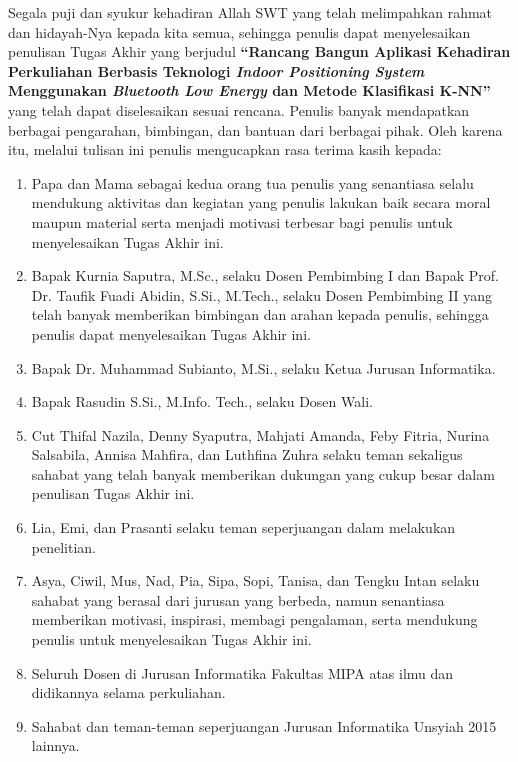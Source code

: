 \preface %


Segala puji dan syukur kehadiran Allah SWT yang telah melimpahkan rahmat dan hidayah-Nya kepada kita semua, sehingga penulis dapat menyelesaikan penulisan Tugas Akhir yang berjudul \textbf{“Rancang Bangun Aplikasi Kehadiran Perkuliahan Berbasis Teknologi \textit{Indoor Positioning System} Menggunakan \textit{Bluetooth Low Energy} dan Metode Klasifikasi K-NN”} yang telah dapat diselesaikan sesuai rencana. Penulis banyak mendapatkan berbagai pengarahan, bimbingan, dan bantuan dari berbagai pihak. Oleh karena itu, melalui tulisan ini penulis mengucapkan rasa terima kasih kepada:

\begin{enumerate}
	\item{Papa dan Mama sebagai kedua orang tua penulis yang senantiasa selalu mendukung aktivitas dan kegiatan yang penulis lakukan baik secara moral maupun material serta menjadi motivasi terbesar bagi penulis untuk menyelesaikan Tugas Akhir ini.}
		\item{Bapak Kurnia Saputra, M.Sc., selaku Dosen Pembimbing I dan Bapak Prof. Dr. Taufik Fuadi Abidin, S.Si., M.Tech., selaku Dosen Pembimbing II yang telah banyak memberikan bimbingan dan arahan kepada penulis, sehingga penulis dapat menyelesaikan Tugas Akhir ini.}
	\item {Bapak Dr. Muhammad Subianto, M.Si., selaku Ketua Jurusan Informatika.}
	\item{Bapak Rasudin S.Si., M.Info. Tech., selaku Dosen Wali.}
	\item Cut Thifal Nazila, Denny Syaputra, Mahjati Amanda, Feby Fitria, Nurina Salsabila, Annisa Mahfira, dan Luthfina Zuhra selaku teman sekaligus sahabat yang telah banyak memberikan dukungan yang cukup besar dalam penulisan Tugas Akhir ini.
	\item Lia, Emi, dan Prasanti selaku teman seperjuangan dalam melakukan penelitian.
	\item Asya, Ciwil, Mus, Nad, Pia, Sipa, Sopi, Tanisa, dan Tengku Intan selaku sahabat yang berasal dari jurusan yang berbeda, namun senantiasa memberikan motivasi, inspirasi, membagi pengalaman, serta mendukung penulis untuk menyelesaikan Tugas Akhir ini. 
	\item{Seluruh Dosen di Jurusan Informatika Fakultas MIPA atas ilmu dan didikannya selama perkuliahan.}
	\item{Sahabat dan teman-teman seperjuangan Jurusan Informatika Unsyiah 2015 lainnya.}
\end{enumerate}

